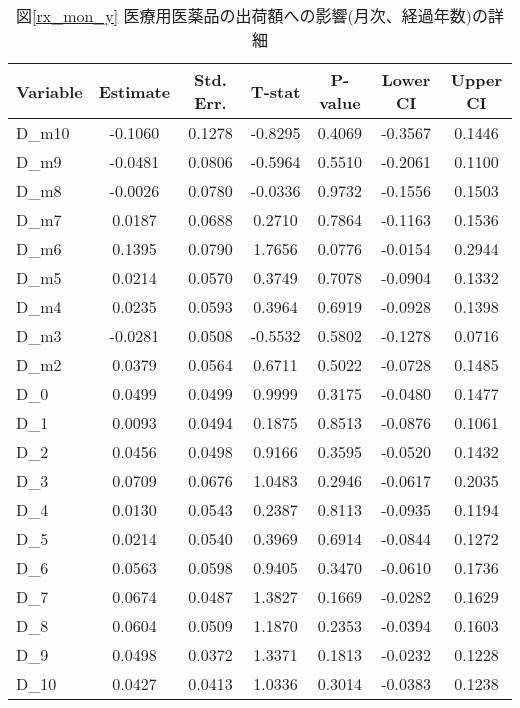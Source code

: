 \documentclass[a4paper,11pt,uplatex]{jsarticle}
\theoremstyle{definition}
\begin{document}
\begin{appendices}
    \begin{table}[ht]
        \centering \small
        \caption{図\ref{rx_mon_y} 医療用医薬品の出荷額への影響(月次、経過年数)の詳細}
        \begin{tabular}{lcccccc}
        \hline
        \textbf{Variable} & \textbf{Estimate} & \textbf{Std. Err.} & \textbf{T-stat} & \textbf{P-value} & \textbf{Lower CI} & \textbf{Upper CI} \\
        \hline
        D\_m10 & -0.1060 & 0.1278 & -0.8295 & 0.4069 & -0.3567 & 0.1446 \\
        D\_m9 & -0.0481 & 0.0806 & -0.5964 & 0.5510 & -0.2061 & 0.1100 \\
        D\_m8 & -0.0026 & 0.0780 & -0.0336 & 0.9732 & -0.1556 & 0.1503 \\
        D\_m7 & 0.0187 & 0.0688 & 0.2710 & 0.7864 & -0.1163 & 0.1536 \\
        D\_m6 & 0.1395 & 0.0790 & 1.7656 & 0.0776 & -0.0154 & 0.2944 \\
        D\_m5 & 0.0214 & 0.0570 & 0.3749 & 0.7078 & -0.0904 & 0.1332 \\
        D\_m4 & 0.0235 & 0.0593 & 0.3964 & 0.6919 & -0.0928 & 0.1398 \\
        D\_m3 & -0.0281 & 0.0508 & -0.5532 & 0.5802 & -0.1278 & 0.0716 \\
        D\_m2 & 0.0379 & 0.0564 & 0.6711 & 0.5022 & -0.0728 & 0.1485 \\
        D\_0 & 0.0499 & 0.0499 & 0.9999 & 0.3175 & -0.0480 & 0.1477 \\
        D\_1 & 0.0093 & 0.0494 & 0.1875 & 0.8513 & -0.0876 & 0.1061 \\
        D\_2 & 0.0456 & 0.0498 & 0.9166 & 0.3595 & -0.0520 & 0.1432 \\
        D\_3 & 0.0709 & 0.0676 & 1.0483 & 0.2946 & -0.0617 & 0.2035 \\
        D\_4 & 0.0130 & 0.0543 & 0.2387 & 0.8113 & -0.0935 & 0.1194 \\
        D\_5 & 0.0214 & 0.0540 & 0.3969 & 0.6914 & -0.0844 & 0.1272 \\
        D\_6 & 0.0563 & 0.0598 & 0.9405 & 0.3470 & -0.0610 & 0.1736 \\
        D\_7 & 0.0674 & 0.0487 & 1.3827 & 0.1669 & -0.0282 & 0.1629 \\
        D\_8 & 0.0604 & 0.0509 & 1.1870 & 0.2353 & -0.0394 & 0.1603 \\
        D\_9 & 0.0498 & 0.0372 & 1.3371 & 0.1813 & -0.0232 & 0.1228 \\
        D\_10 & 0.0427 & 0.0413 & 1.0336 & 0.3014 & -0.0383 & 0.1238 \\

\end{tabular}
\end{table}
\end{appendices}
\end{document}

